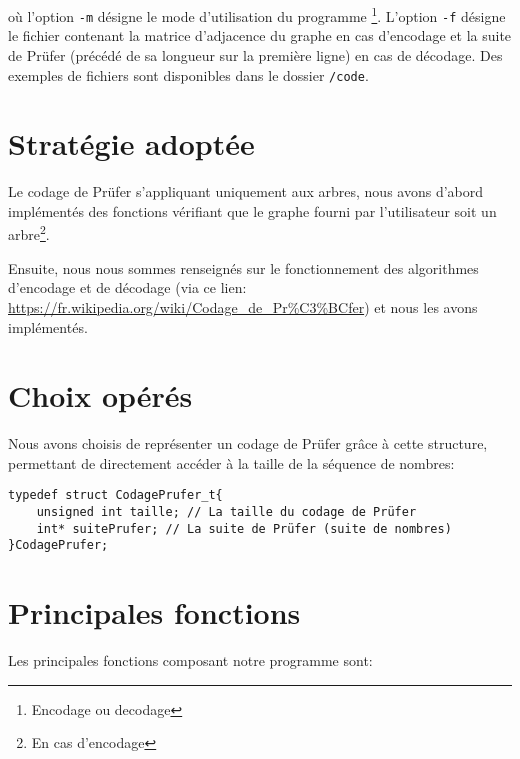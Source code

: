 \documentclass[a4paper, 11pt, oneside]{article}
\begin{document}
où l'option \texttt{-m} désigne le mode d'utilisation du programme \footnote{Encodage ou decodage}. L'option \texttt{-f} désigne le fichier contenant la matrice d'adjacence du graphe en cas d'encodage et la suite de Prüfer (précédé de sa longueur sur la première ligne) en cas de décodage. Des exemples de fichiers sont disponibles dans le dossier \texttt{/code}.

\section{Stratégie adoptée}

Le codage de Prüfer s'appliquant uniquement aux arbres, nous avons d'abord implémentés des fonctions vérifiant que le graphe fourni par l'utilisateur soit un arbre\footnote{En cas d'encodage}.

Ensuite, nous nous sommes renseignés sur le fonctionnement des algorithmes d'encodage et de décodage (via ce lien: \url{https://fr.wikipedia.org/wiki/Codage_de_Pr%C3%BCfer}) et nous les avons implémentés.

\newpage

\section{Choix opérés}

Nous avons choisis de représenter un codage de Prüfer grâce à cette structure, permettant de directement accéder à la taille de la séquence de nombres: 

\begin{lstlisting}
typedef struct CodagePrufer_t{
	unsigned int taille; // La taille du codage de Prüfer
	int* suitePrufer; // La suite de Prüfer (suite de nombres)
}CodagePrufer;
\end{lstlisting}

\section{Principales fonctions}

Les principales fonctions composant notre programme sont:\\
\end{document}
